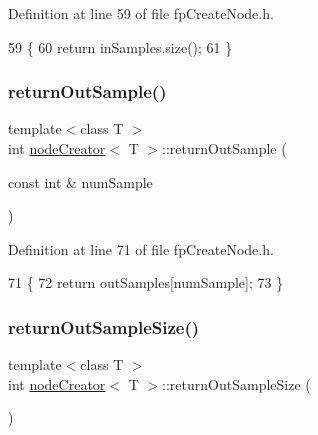 Definition at line 59 of file fp\+Create\+Node.\+h.


\begin{DoxyCode}
59                                 \{
60             \textcolor{keywordflow}{return} inSamples.size();
61         \}
\end{DoxyCode}
\mbox{\label{classnodeCreator_affd4ae08a5562f4a5c7bb0068ecf8e8d}} 
\subsubsection{\texorpdfstring{return\+Out\+Sample()}{returnOutSample()}}
{\footnotesize\ttfamily template$<$class T $>$ \\
int \hyperlink{classnodeCreator}{node\+Creator}$<$ T $>$\+::return\+Out\+Sample (\begin{DoxyParamCaption}\item[{const int \&}]{num\+Sample }\end{DoxyParamCaption})\hspace{0.3cm}{\ttfamily [inline]}}



Definition at line 71 of file fp\+Create\+Node.\+h.


\begin{DoxyCode}
71                                                         \{
72             \textcolor{keywordflow}{return} outSamples[numSample];
73         \}
\end{DoxyCode}
\mbox{\label{classnodeCreator_a50d306716d731c8d0754d8628c311f11}} 
\subsubsection{\texorpdfstring{return\+Out\+Sample\+Size()}{returnOutSampleSize()}}
{\footnotesize\ttfamily template$<$class T $>$ \\
int \hyperlink{classnodeCreator}{node\+Creator}$<$ T $>$\+::return\+Out\+Sample\+Size (\begin{DoxyParamCaption}{ }\end{DoxyParamCaption})\hspace{0.3cm}{\ttfamily [inline]}}




